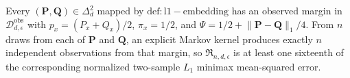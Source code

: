 Every \((\mathbf P,\mathbf Q)\in\Delta_d^2\) mapped by \(\mathrm{def:l1-embedding}\) has an observed margin in \(\mathcal D_{d,\epsilon}^{\mathrm{obs}}\) with \(p_x=(P_x+Q_x)/2\), \(\pi_x=1/2\), and \(\Psi=1/2+\lVert\mathbf P-\mathbf Q\rVert_1/4\).  From \(n\) draws from each of \(\mathbf P\) and \(\mathbf Q\), an explicit Markov kernel produces exactly \(n\) independent observations from that margin, so \(\mathfrak R_{n,d,\epsilon}\) is at least one sixteenth of the corresponding normalized two-sample \(L_1\) minimax mean-squared error.